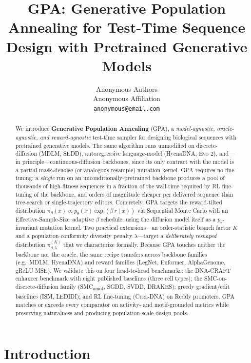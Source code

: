 \documentclass{article}
\title{GPA: Generative Population Annealing for Test-Time Sequence Design with Pretrained Generative Models}
\author{%
  Anonymous Authors \\
  Anonymous Affiliation \\
  \texttt{anonymous@email.com}
}
\theoremstyle{definition}
\theoremstyle{remark}
\newcommand{\gpa}{\textsc{GPA}\xspace}
\newcommand{\drakes}{\textsc{DRAKES}\xspace}
\newcommand{\ctrldna}{\textsc{Ctrl-DNA}\xspace}
\newcommand{\evo}{\textsc{Evo 2}\xspace}
\newcommand{\svdd}{\textsc{SVDD}\xspace}
\newcommand{\ism}{\textsc{ISM}\xspace}
\newcommand{\ledidi}{\textsc{LEDIDI}\xspace}
\newcommand{\dnacraft}{\textsc{DNA-CRAFT}\xspace}
\newcommand{\smcamot}{\textsc{SMC}\textsubscript{amot}\xspace}
\newcommand{\sgdd}{\textsc{SGDD}\xspace}
\begin{document}
\maketitle

\begin{abstract}
We introduce \textbf{Generative Population Annealing} (\gpa), a \emph{model-agnostic, oracle-agnostic, and reward-agnostic} test-time sampler for designing biological sequences with pretrained generative models. The same algorithm runs unmodified on discrete-diffusion (MDLM, SEDD), autoregressive language-model (HyenaDNA, \evo), and---in principle---continuous-diffusion backbones, since its only contract with the model is a partial-mask$\circ$denoise (or analogous resample) mutation kernel. \gpa{} requires no fine-tuning; a \emph{single} run on an unconditionally-pretrained backbone produces a pool of thousands of high-fitness sequences in a fraction of the wall-time required by RL fine-tuning of the backbone, and orders of magnitude cheaper per delivered sequence than tree-search or single-trajectory editors. Concretely, \gpa{} targets the reward-tilted distribution $\pi_\beta(x)\propto p_\theta(x)\exp(\beta\,r(x))$ via Sequential Monte Carlo with an Effective-Sample-Size--adaptive $\beta$ schedule, using the diffusion model itself as a $p_\theta$-invariant mutation kernel. Two practical extensions---an order-statistic branch factor $K$ and a population-conformity diversity penalty $\lambda$---target a \emph{deliberately reshaped} distribution $\pi_{\beta,\lambda}^{(K)}$ that we characterize formally. Because \gpa{} touches neither the backbone nor the oracle, the same recipe transfers across backbone families (e.g.\ MDLM, HyenaDNA) and reward families (LegNet, Enformer, AlphaGenome, gReLU MSE). We validate this on four head-to-head benchmarks: the \dnacraft{} enhancer benchmark with eight published baselines (three cell types); the SMC-on-discrete-diffusion family (\smcamot, \sgdd, \svdd, \drakes); greedy gradient/edit baselines (\ism, \ledidi); and RL fine-tuning (\ctrldna) on Reddy promoters. \gpa{} matches or exceeds every comparator on activity- and motif-grounded metrics while preserving naturalness and producing population-scale design pools.
\end{abstract}

\section{Introduction}\label{sec:intro}
\end{document}
